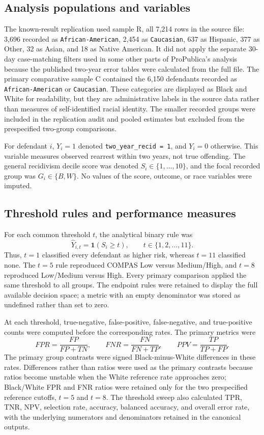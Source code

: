 \documentclass[11pt,letterpaper]{article}
\begin{document}
\subsection{Analysis populations and variables}

The known-result replication used sample R, all 7,214 rows in the source file: 3,696 recorded as \texttt{African-American}, 2,454 as \texttt{Caucasian}, 637 as Hispanic, 377 as Other, 32 as Asian, and 18 as Native American. It did not apply the separate 30-day case-matching filters used in some other parts of ProPublica's analysis because the published two-year error tables were calculated from the full file. The primary comparative sample C contained the 6,150 defendants recorded as \texttt{African-American} or \texttt{Caucasian}. These categories are displayed as Black and White for readability, but they are administrative labels in the source data rather than measures of self-identified racial identity. The smaller recorded groups were included in the replication audit and pooled estimates but excluded from the prespecified two-group comparisons.

For defendant $i$, $Y_i=1$ denoted \texttt{two\_year\_recid = 1}, and $Y_i=0$ otherwise. This variable measures observed rearrest within two years, not true offending. The general recidivism decile score was denoted $S_i\in\{1,\ldots,10\}$, and the focal recorded group was $G_i\in\{B,W\}$. No values of the score, outcome, or race variables were imputed.

\subsection{Threshold rules and performance measures}

For each common threshold $t$, the analytical binary rule was
\[
\widehat{Y}_{i,t}=\mathbf{1}(S_i\ge t),
\qquad t\in\{1,2,\ldots,11\}.
\]
Thus, $t=1$ classified every defendant as higher risk, whereas $t=11$ classified none. The $t=5$ rule reproduced COMPAS Low versus Medium/High, and $t=8$ reproduced Low/Medium versus High. Every primary comparison applied the same threshold to all groups. The endpoint rules were retained to display the full available decision space; a metric with an empty denominator was stored as undefined rather than set to zero.

At each threshold, true-negative, false-positive, false-negative, and true-positive counts were computed before the corresponding rates. The primary metrics were
\[
FPR=\frac{FP}{FP+TN},\qquad
FNR=\frac{FN}{FN+TP},\qquad
PPV=\frac{TP}{TP+FP}.
\]
The primary group contrasts were signed Black-minus-White differences in these rates. Differences rather than ratios were used as the primary contrasts because ratios become unstable when the White reference rate approaches zero; Black/White FPR and FNR ratios were retained only for the two prespecified reference cutoffs, $t=5$ and $t=8$. The threshold sweep also calculated TPR, TNR, NPV, selection rate, accuracy, balanced accuracy, and overall error rate, with the underlying numerators and denominators retained in the canonical outputs.
\end{document}
